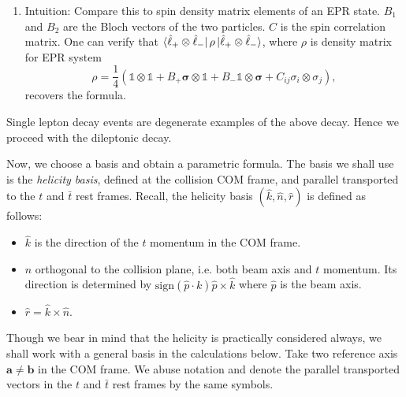 \begin{tcolorbox}[breakable,colback=cyan!10,title=Angular distribution]
\begin{enumerate}[leftmargin=!,labelindent=!,itemindent=-15pt]
        \item Intuition: Compare this to spin density matrix elements of an EPR state. $B_1$ and $B_2$ are the Bloch vectors of the two particles. $C$ is the spin correlation matrix. One can verify that $\bra{\hat \ell_+ \otimes \hat \ell_-} \rho \ket{\hat \ell _+  \otimes \hat \ell _-}$, where $\rho$ is density matrix for EPR system
        \[
        \rho = \frac{1}{4} \left(\mathbb{1} \otimes \mathbb{1} + B_+ \mathbf{\sigma} \otimes \mathbb{1} + B_- \mathbb{1} \otimes \mathbf{\sigma} + C_{ij} \sigma_i \otimes \sigma_j \right),
        \]
        recovers the formula.
    \end{enumerate}
\end{tcolorbox}

Single lepton decay events are degenerate examples of the above decay. Hence we proceed with the dileptonic decay.

Now, we choose a basis and obtain a parametric formula. The basis we shall use is the \textit{helicity basis}, defined at the collision COM frame, and parallel transported to the $t$ and $\bar t$ rest frames. Recall, the helicity basis $(\hat{k}, \hat{n}, \hat{r})$ is defined as follows: \autocite[Fig.~1]{cmsMeasurementTop2019}
\begin{itemize}
    \item $\hat{k}$ is the direction of the $t$ momentum in the COM frame.
    \item $\hat{n}$ orthogonal to the collision plane, i.e. both beam axis and $t$ momentum. Its direction is determined by $\text{sign}(\hat p \cdot k)\hat{p} \times \hat{k}$ where $\hat{p}$ is the beam axis.
    \item $\hat{r} = \hat{k} \times \hat{n}$.
\end{itemize}
Though we bear in mind that the helicity is practically considered always, we shall work with a general basis in the calculations below. Take two reference axis $\mathbf{a}\neq\mathbf{b}$ in the COM frame. We abuse notation and denote the parallel transported vectors in the $t$ and $\bar t$ rest frames by the same symbols. 


